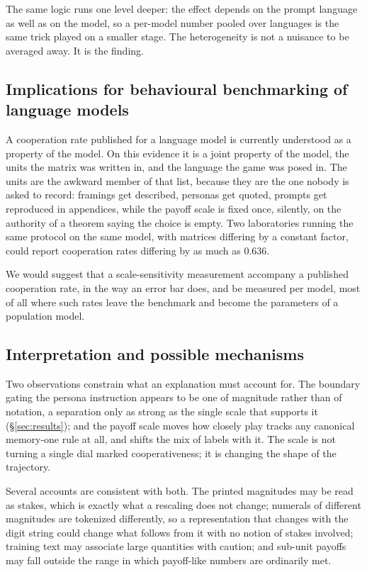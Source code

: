 \documentclass[11pt,a4paper]{article}
\begin{document}
The same logic runs one level deeper: the effect depends on the prompt language
as well as on the model, so a per-model number pooled over languages is the same
trick played on a smaller stage. The heterogeneity is not a nuisance to be
averaged away. It is the finding.

\subsection{Implications for behavioural benchmarking of language models}

A cooperation rate published for a language model is currently understood as a
property of the model. On this evidence it is a joint property of the model, the
units the matrix was written in, and the language the game was posed in. The
units are the awkward member of that list, because they are the one nobody is
asked to record: framings get described, personas get quoted, prompts get
reproduced in appendices, while the payoff scale is fixed once, silently, on the
authority of a theorem saying the choice is empty. Two laboratories running the
same protocol on the same model, with matrices differing by a constant factor,
could report cooperation rates differing by as much as 0.636.

We would suggest that a scale-sensitivity measurement accompany a published
cooperation rate, in the way an error bar does, and be measured per model,
most of all where such rates leave the benchmark and become the parameters of a
population model.

\subsection{Interpretation and possible mechanisms}

Two observations constrain what an explanation must account for. The boundary
gating the persona instruction appears to be one of magnitude rather than of
notation, a separation only as strong as the single scale that supports it
(\S\ref{sec:results}); and the payoff scale moves how closely play tracks any
canonical memory-one rule at all, and shifts the mix of labels with it. The
scale is not turning a single dial marked cooperativeness; it is changing the
shape of the trajectory.

Several accounts are consistent with both. The printed magnitudes may be read as
stakes, which is exactly what a rescaling does not change; numerals of different
magnitudes are tokenized differently, so a representation that changes with the
digit string could change what follows from it with no notion of stakes
involved; training text may associate large quantities with caution; and
sub-unit payoffs may fall outside the range in which payoff-like numbers are
ordinarily met.
\end{document}
